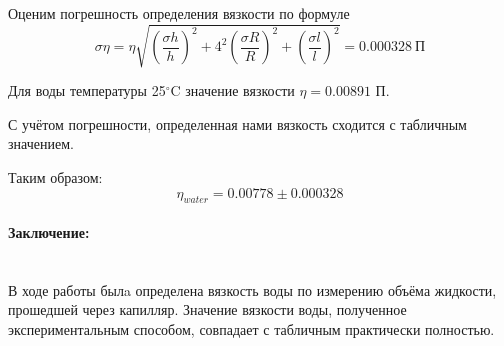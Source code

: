 \documentclass[a4paper, 12pt]{article}
\newcommand{\parag}[1]{\paragraph*{#1:}}
\begin{document}
Оценим погрешность определения вязкости по формуле
\begin{equation*}
    \sigma \eta = \eta \sqrt{(\frac{\sigma h}{h})^2 + 4^2(\frac{\sigma R}{R})^2 + (\frac{\sigma l}{l})^2} = 0.000328~П
\end{equation*}
    
Для воды температуры 25$^{\circ} $C значение вязкости $\eta = 0.00891$ П. \par

С учётом погрешности, определенная нами вязкость сходится с табличным значением.

Таким образом:
\begin{equation*}
    \eta_{water} = 0.00778 \pm 0.000328
\end{equation*}


\parag {Заключение} ~\\
В ходе работы былa определена вязкость воды по измерению объёма жидкости, прошедшей через капилляр. Значение вязкости воды, полученное экспериментальным способом, совпадает с табличным практически полностью.
\end{document}
